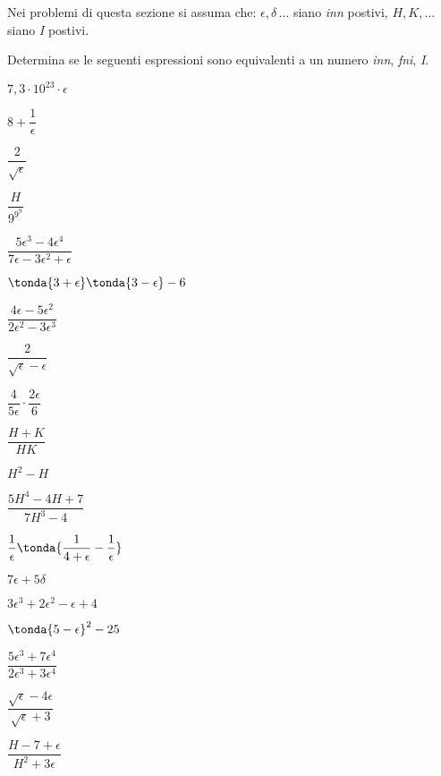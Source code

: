 Nei problemi di questa sezione si assuma che: 
\(\epsilon, \delta\, \dots\) siano \emph{inn} postivi, 
\(H, K, \dots\) siano \emph{I} postivi.

\begin{esercizio}\label{ese:iper_op_01}
Determina se le seguenti espressioni sono equivalenti a un numero 
\emph{inn}, \emph{fni}, \emph{I}.
\begin{multicols}{3}
\begin{enumeratea}
 \item \(7,3 \cdot 10^23 \cdot \epsilon\)
 \item \(8 +\dfrac{1}{\epsilon}\)
 \item \(\dfrac{2}{\sqrt{\epsilon}}\) 
 \item \(\dfrac{H}{9^{9^9}}\) 
 \item \(\dfrac{5 \epsilon^3 -4 \epsilon^4}
               {7 \epsilon -3 \epsilon^2 +\epsilon}\)
 \item \(\tonda{3 +\epsilon} \tonda{3 -\epsilon} -6\) 
 \item \(\dfrac{4 \epsilon - 5 \epsilon^2}{2 \epsilon^2 -3 \epsilon^3}\) 
 \item \(\dfrac{2}{\sqrt{\epsilon} - \epsilon}\) 
 \item \(\dfrac{4}{5 \epsilon} \cdot \dfrac{2 \epsilon}{6}\) 
 \item \(\dfrac{H + K}{HK}\) 
 \item \(H^2 - H\)  
 \item \(\dfrac{5 H^4 -4 H +7} {7 H^3 -4}\)
 \item \(\dfrac{1}{\epsilon} \tonda{\dfrac{1} {4 + \epsilon} -
                                    \dfrac{1}{\epsilon}}\)
 \item \(7 \epsilon + 5 \delta\)
 \item \(3 \epsilon^3 +2 \epsilon^2 - \epsilon +4\)
 \item \(\tonda{5 - \epsilon}^2 - 25\)
 \item \(\dfrac{5 \epsilon^3 + 7  \epsilon^4}{2 \epsilon^3 + 3  \epsilon^4}\)
 \item \(\dfrac{\sqrt{\epsilon} -4 \epsilon}{\sqrt{\epsilon} + 3}\)
 \item \(\dfrac{H -7 +\epsilon}{H^2 + 3 \epsilon}\)
\end{enumeratea}
\end{multicols}
\end{esercizio}

\subsubsection*{}

